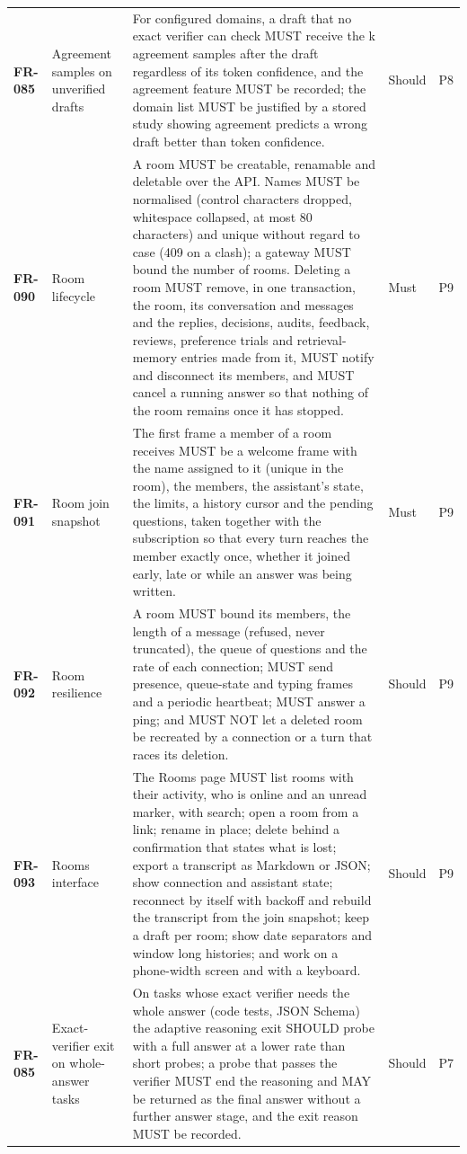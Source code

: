\begin{longtable}{@{}p{1.45cm}p{2.5cm}p{8.1cm}p{1.6cm}p{1.1cm}@{}}
\textbf{FR-085} & Agreement samples on unverified drafts & For configured domains, a draft that no exact verifier can check MUST receive the k agreement samples after the draft regardless of its token confidence, and the agreement feature MUST be recorded; the domain list MUST be justified by a stored study showing agreement predicts a wrong draft better than token confidence. & Should & P8\\
\textbf{FR-090} & Room lifecycle & A room MUST be creatable, renamable and deletable over the API. Names MUST be normalised (control characters dropped, whitespace collapsed, at most 80 characters) and unique without regard to case (409 on a clash); a gateway MUST bound the number of rooms. Deleting a room MUST remove, in one transaction, the room, its conversation and messages and the replies, decisions, audits, feedback, reviews, preference trials and retrieval-memory entries made from it, MUST notify and disconnect its members, and MUST cancel a running answer so that nothing of the room remains once it has stopped. & Must & P9\\
\textbf{FR-091} & Room join snapshot & The first frame a member of a room receives MUST be a welcome frame with the name assigned to it (unique in the room), the members, the assistant's state, the limits, a history cursor and the pending questions, taken together with the subscription so that every turn reaches the member exactly once, whether it joined early, late or while an answer was being written. & Must & P9\\
\textbf{FR-092} & Room resilience & A room MUST bound its members, the length of a message (refused, never truncated), the queue of questions and the rate of each connection; MUST send presence, queue-state and typing frames and a periodic heartbeat; MUST answer a ping; and MUST NOT let a deleted room be recreated by a connection or a turn that races its deletion. & Should & P9\\
\textbf{FR-093} & Rooms interface & The Rooms page MUST list rooms with their activity, who is online and an unread marker, with search; open a room from a link; rename in place; delete behind a confirmation that states what is lost; export a transcript as Markdown or JSON; show connection and assistant state; reconnect by itself with backoff and rebuild the transcript from the join snapshot; keep a draft per room; show date separators and window long histories; and work on a phone-width screen and with a keyboard. & Should & P9\\
\textbf{FR-085} & Exact-verifier exit on whole-answer tasks & On tasks whose exact verifier needs the whole answer (code tests, JSON Schema) the adaptive reasoning exit SHOULD probe with a full answer at a lower rate than short probes; a probe that passes the verifier MUST end the reasoning and MAY be returned as the final answer without a further answer stage, and the exit reason MUST be recorded. & Should & P7\\

\end{longtable}

